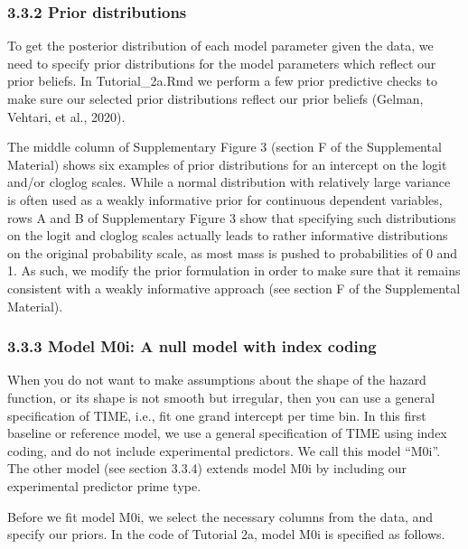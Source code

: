\documentclass[
  man, donotrepeattitle,floatsintext]{apa6}
\begin{document}
\normalsize

\subsubsection{3.3.2 Prior distributions}\label{prior-distributions}

To get the posterior distribution of each model parameter given the data, we need to specify prior distributions for the model parameters which reflect our prior beliefs.
In Tutorial\_2a.Rmd we perform a few prior predictive checks to make sure our selected prior distributions reflect our prior beliefs (Gelman, Vehtari, et al., 2020).

The middle column of Supplementary Figure 3 (section F of the Supplemental Material) shows six examples of prior distributions for an intercept on the logit and/or cloglog scales. While a normal distribution with relatively large variance is often used as a weakly informative prior for continuous dependent variables, rows A and B of Supplementary Figure 3 show that specifying such distributions on the logit and cloglog scales actually leads to rather informative distributions on the original probability scale, as most mass is pushed to probabilities of 0 and 1. As such, we modify the prior formulation in order to make sure that it remains consistent with a weakly informative approach (see section F of the Supplemental Material).

\subsubsection{3.3.3 Model M0i: A null model with index coding}\label{model-m0i-a-null-model-with-index-coding}

When you do not want to make assumptions about the shape of the hazard function, or its shape is not smooth but irregular, then you can use a general specification of TIME, i.e., fit one grand intercept per time bin. In this first baseline or reference model, we use a general specification of TIME using index coding, and do not include experimental predictors. We call this model ``M0i''. The other model (see section 3.3.4) extends model M0i by including our experimental predictor prime type.

Before we fit model M0i, we select the necessary columns from the data, and specify our priors. In the code of Tutorial 2a, model M0i is specified as follows.
\end{document}
